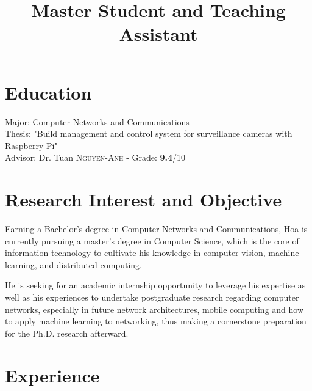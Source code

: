 \documentclass[11pt,a4paper,roman]{moderncv}        %
\title{Master Student and Teaching Assistant}                               %
\begin{document}
\makecvtitle
\section{Education}
{Major: Computer Networks and Communications
\\ Thesis: "Build management and control system for surveillance cameras with Raspberry Pi"
\\ Advisor: Dr. Tuan \textsc{Nguyen-Anh} - Grade: \textbf{9.4}/10\\}  %


\section{Research Interest and Objective}
Earning a Bachelor's degree in Computer Networks and Communications, Hoa is currently pursuing a master's degree in Computer Science, which is the core of information technology to cultivate his knowledge in computer vision, machine learning, and distributed computing. 

He is seeking for an academic internship opportunity to leverage his expertise as well as his experiences to undertake postgraduate research regarding computer networks, especially in future network architectures, mobile computing and how to apply machine learning to networking, thus making a cornerstone preparation for the Ph.D. research afterward. 


\section{Experience}
\end{document}
